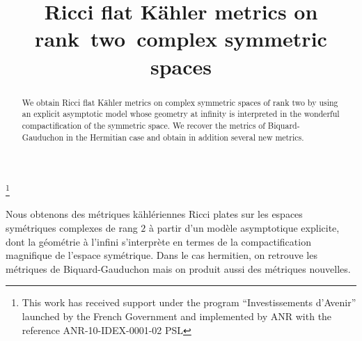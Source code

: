 \documentclass[JEP,XML,SOM,Unicode, NoEqCountersInSection, NoFloatCountersInSection]{cedram}
\theoremstyle{plain}
\theoremstyle{definition}
\begin{document}
\frontmatter
\title{Ricci flat Kähler metrics on rank~two~complex symmetric spaces}

\author[\initial{O.} \lastname{Biquard}]{ }
\address{Sorbonne Université and École Normale Supérieure, PSL University\\
45 rue d'Ulm, 75005 Paris, France}

\author[\initial{T.} \lastname{Delcroix}]{ }
\address{Université de Strasbourg, IRMA\\
7 rue René Descartes, 67000 Strasbourg, France}

\thanks{This work has received support under the program ``Investissements d'Avenir'' launched by the French Government and implemented by ANR with the reference ANR-10-IDEX-0001-02 PSL}

\begin{abstract}
We obtain Ricci flat Kähler metrics on complex symmetric spaces of
rank two by using an explicit asymptotic model whose geometry at
infinity is interpreted in the wonderful compactification of the
symmetric space. We recover the metrics of Biquard-Gauduchon in the
Hermitian case and obtain in addition several new metrics.
\end{abstract}


\begin{altabstract}
Nous obtenons des métriques kählériennes Ricci plates sur les espaces symétriques complexes de rang $2$ à partir d'un modèle asymptotique explicite, dont la géométrie à l'infini s'interprète en termes de la compactification magnifique de l'espace symétrique. Dans le cas hermitien, on retrouve les métriques de Biquard-Gauduchon mais on produit aussi des métriques nouvelles.
\end{altabstract}




\maketitle
\vspace*{-\baselineskip}%
\tableofcontents
\mainmatter
\end{document}

